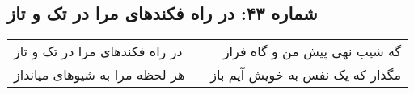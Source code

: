 \begin{center}
\section*{شماره ۴۳: در راه فکندهای مرا در تک و تاز}
\label{sec:043}
\begin{longtable}{l p{0.5cm} r}
در راه فکندهای مرا در تک و تاز
&&
گه شیب نهی پیش من و گاه فراز
\\
هر لحظه مرا به شیوهای میانداز
&&
مگذار که یک نفس به خویش آیم باز
\\
\end{longtable}
\end{center}
